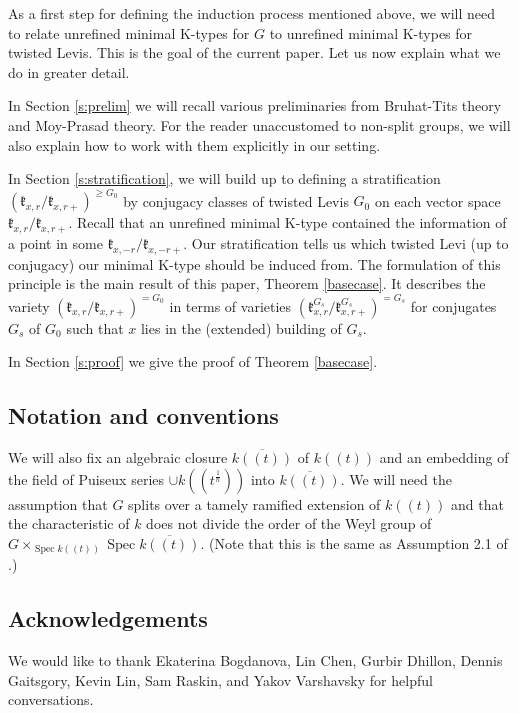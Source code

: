\documentclass[12pt]{article}
\DeclareMathOperator{\Spec}{Spec}
\theoremstyle{remark}
\begin{document}
As a first step for defining the induction process mentioned above, we will need to relate unrefined minimal K-types for $G$ to unrefined minimal K-types for twisted Levis. This is the goal of the current paper. Let us now explain what we do in greater detail.

In Section \ref{s:prelim} we will recall various preliminaries from Bruhat-Tits theory and Moy-Prasad theory. For the reader unaccustomed to non-split groups, we will also explain how to work with them explicitly in our setting. 

In Section \ref{s:stratification}, we will build up to defining a stratification $(\mathfrak{k}_{x,r}/\mathfrak{k}_{x,r+})^{\geq G_0}$ by conjugacy classes of twisted Levis $G_0$ on each vector space $\mathfrak{k}_{x,r}/\mathfrak{k}_{x,r+}.$ Recall that an unrefined minimal K-type contained the information of a point in some $\mathfrak{k}_{x,-r}/\mathfrak{k}_{x,-r+}$. Our stratification tells us which twisted Levi (up to conjugacy) our minimal K-type should be induced from. The formulation of this principle is the main result of this paper, Theorem \ref{basecase}. It describes the variety $(\mathfrak{k}_{x,r}/\mathfrak{k}_{x,r+})^{=G_0}$ in terms of varieties $(\mathfrak{k}_{x,r}^{G_s}/\mathfrak{k}_{x,r+}^{G_s})^{=G_s}$ for conjugates $G_s$ of $G_0$ such that $x$ lies in the (extended) building of $G_s$.

In Section \ref{s:proof} we give the proof of Theorem \ref{basecase}.

\subsection{Notation and conventions}

We will also fix an algebraic closure $\overline{k((t))}$ of $k((t))$ and an embedding of the field of Puiseux series $\cup k((t^{\frac{1}{n}}))$ into $\overline{k((t))}$. We will need the assumption that $G$ splits over a tamely ramified extension of $k((t))$ and that the characteristic of $k$ does not divide the order of the Weyl group of $G\times_{\Spec k((t))}\Spec\overline{k((t))}$. (Note that this is the same as Assumption 2.1 of \cite{tametypes}.)

\subsection{Acknowledgements}

We would like to thank Ekaterina Bogdanova, Lin Chen, Gurbir Dhillon, Dennis Gaitsgory, Kevin Lin, Sam Raskin, and Yakov Varshavsky for helpful conversations. 
\end{document}
